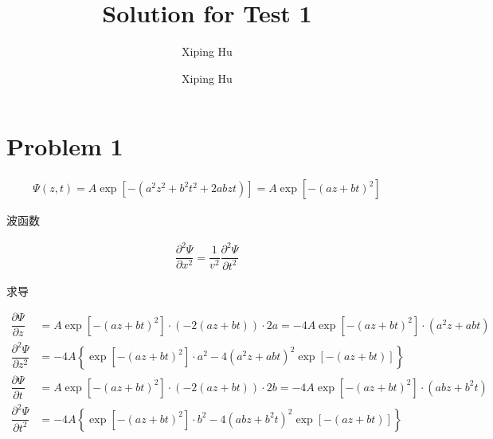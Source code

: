 \documentclass{article}
\author{Xiping Hu}
\author{Xiping Hu}
\affil{https://hxp.plus/}
\title{Solution for Test 1}
\begin{document}
\maketitle

\section{Problem 1}

\begin{equation*}
  \begin{aligned}
    \Psi \left( z,t \right) = A \exp \left[ - \left( a^2 z^2 + b^2 t^2 + 2 a b z t \right) \right] = A \exp \left[ - \left( a z + b t \right)^2 \right]
  \end{aligned}
\end{equation*}

波函数

\begin{equation*}
  \begin{aligned}
    \dfrac{\partial^2 \Psi }{\partial x^2 } = \dfrac{1}{v^2} \dfrac{\partial^2 \Psi}{\partial t^2} 
  \end{aligned}
\end{equation*}

求导

\begin{equation*}
  \begin{aligned}
    \dfrac{\partial \Psi}{\partial z} &= A \exp \left[ - \left( a z + b t \right)^2 \right] \cdot \left( - 2 \left( a z + b t \right) \right) \cdot 2 a = - 4 A \exp \left[ - \left( a z + b t \right)^2 \right] \cdot \left(a^2 z + a b t \right) \\
    \dfrac{\partial^2 \Psi}{\partial z^2} &= - 4 A \left\{ \exp \left[ - \left( a z + b t \right)^2 \right] \cdot a^2 - 4 \left( a^2 z + a b t \right)^2 \exp \left[ - \left( a z + b t \right)  \right]\right\} \\
    \dfrac{\partial \Psi}{\partial t} &= A \exp \left[ - \left( a z + b t \right)^2 \right] \cdot \left( - 2 \left( a z + b t \right) \right) \cdot 2 b = - 4 A \exp \left[ - \left( a z + b t \right)^2 \right] \cdot \left(a b z + b^2 t \right) \\
    \dfrac{\partial^2 \Psi}{\partial t^2} &= - 4 A \left\{ \exp \left[ - \left( a z + b t \right)^2 \right] \cdot b^2 - 4 \left( a b z + b^2 t \right)^2 \exp \left[ - \left( a z + b t \right)  \right]\right\} 
  \end{aligned}
\end{equation*}
\end{document}
